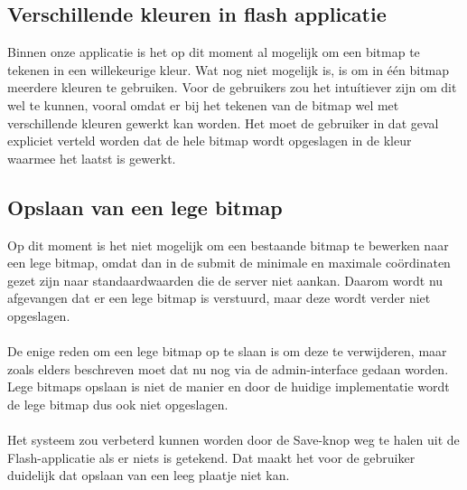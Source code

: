 \subsection{Verschillende kleuren in flash applicatie} %
Binnen onze applicatie is het op dit moment al mogelijk om een bitmap te tekenen in een willekeurige kleur. 
Wat nog niet mogelijk is, is om in \'{e}\'{e}n bitmap meerdere kleuren te gebruiken.
Voor de gebruikers zou het intu\'{i}tiever zijn om dit wel te kunnen, vooral omdat er bij het tekenen van de bitmap wel met verschillende kleuren gewerkt kan worden.
Het moet de gebruiker in dat geval expliciet verteld worden dat de hele bitmap wordt opgeslagen in de kleur waarmee het laatst is gewerkt.


\subsection{Opslaan van een lege bitmap} %
Op dit moment is het niet mogelijk om een bestaande bitmap te bewerken naar een lege bitmap, omdat dan in de submit de minimale en maximale co\"ordinaten gezet zijn naar standaardwaarden die de server niet aankan. Daarom wordt nu afgevangen dat er een lege bitmap is verstuurd, maar deze wordt verder niet opgeslagen.
\\
\\
De enige reden om een lege bitmap op te slaan is om deze te verwijderen, maar zoals elders beschreven moet dat nu nog via de admin-interface gedaan worden. Lege bitmaps opslaan is niet de manier en door de huidige implementatie wordt de lege bitmap dus ook niet opgeslagen.
\\
\\
Het systeem zou verbeterd kunnen worden door de Save-knop weg te halen uit de Flash-applicatie als er niets is getekend. Dat maakt het voor de gebruiker duidelijk dat opslaan van een leeg plaatje niet kan.

